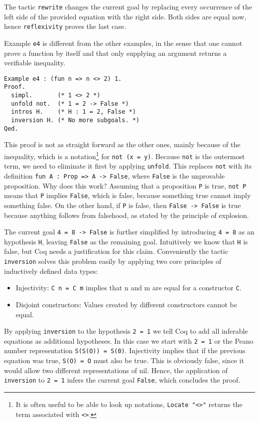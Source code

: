 \documentclass{scrreprt}
\newcommand{\todo}[1]{\marginpar{\textbf{TODO:} #1}}
\newcommand{\coqinline}[1]{\texttt{#1}}
\begin{document}
The tactic \coqinline{rewrite} changes the current goal by replacing every occurrence of the left side of the provided equation with the right side. Both sides are equal now, hence \coqinline{reflexivity} proves the last case.
\par 
Example \coqinline{e4} is different from the other examples, in the sense that one cannot prove a function by itself and that only supplying an argument returns a verifiable inequality. 
\begin{verbatim}
Example e4 : (fun n => n <> 2) 1.
Proof.
  simpl.       (* 1 <> 2 *)
  unfold not.  (* 1 = 2 -> False *)
  intros H.    (* H : 1 = 2, False *)
  inversion H. (* No more subgoals. *)
Qed.
\end{verbatim}
This proof is not as straight forward as the other ones, mainly because of the inequality, which is a notation\footnote{It is often useful to be able to look up notations, \coqinline{Locate "<>"} returns the term associated with \coqinline{<>}.} for \coqinline{not (x = y)}. Because \coqinline{not} is the outermost term, we need to eliminate it first by applying \coqinline{unfold}. This replaces \coqinline{not} with its definition \coqinline{fun A : Prop => A -> False}, where \coqinline{False} is the unprovable proposition. Why does this work?
Assuming that a proposition \coqinline{P} is true, \coqinline{not P} means that \coqinline{P} implies \coqinline{False}, which is false, because something true cannot imply something false. On the other hand, if \coqinline{P} is false, then \coqinline{False -> False} is true because anything follows from falsehood, as stated by the principle of explosion. \todo{verweis?}
\par
The current goal \coqinline{4 = 8 -> False} is further simplified by introducing \coqinline{4 = 8} as an hypothesis \coqinline{H}, leaving \coqinline{False} as the remaining goal. Intuitively we know that \coqinline{H} is false, but Coq needs a justification for this claim.
Conveniently the tactic \coqinline{inversion} solves this problem easily by applying two core principles of inductively defined data types:
\begin{itemize}
	\item Injectivity: \coqinline{C n = C m} implies that n and m are equal for a constructor \coqinline{C}.
	\item Disjoint constructors: Values created by different constructors cannot be equal.
\end{itemize}
By applying \coqinline{inversion} to the hypothesis \coqinline{2 = 1} we tell Coq to add all inferable equations as additional hypotheses. In this case we start with \coqinline{2 = 1} or the Peano number representation \coqinline{S(S(O)) = S(0)}. Injectivity implies that if the previous equation was true, \coqinline{S(O) = O} must also be true. This is obviously false, since it would allow two different representations of nil. Hence, the application of \coqinline{inversion} to \coqinline{2 = 1} infers the current goal \coqinline{False}, which concludes the proof.
\end{document}
